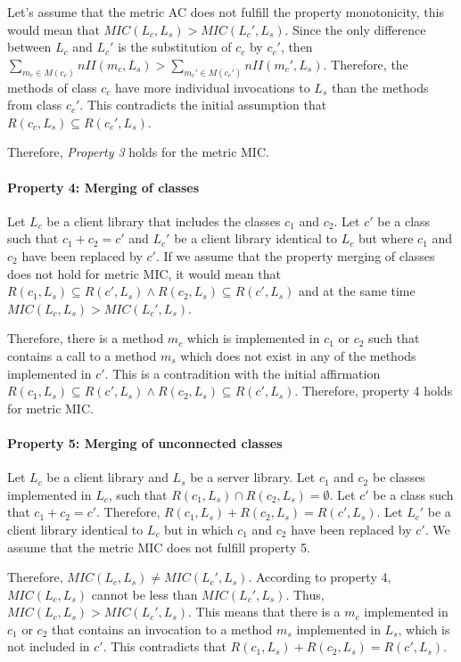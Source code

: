 Let's assume that the metric AC does not fulfill the property monotonicity, this would mean that $MIC(L_c, L_s) > MIC(L_c', L_s)$. Since the only difference between $L_c$ and $L_c'$ is the substitution of $c_c$ by $c_c'$, then $\sum_{m_c \in M(c_c)} nII(m_c, L_s) > \sum_{m_c' \in M(c_c')} nII(m_c', L_s)$. Therefore, the methods of class $c_c$ have more individual invocations to $L_s$ than the methods from class $c_c'$. This contradicts the initial assumption that $R(c_c, L_s) \subseteq R(c_c', L_s)$.

Therefore, \textit{Property 3} holds for the metric MIC.

\paragraph{Property 4: Merging of classes}
Let $L_c$ be a client library that includes the classes $c_1$ and $c_2$. Let $c'$ be a class such that $c_1 + c_2 = c'$ and $L_c'$ be a client library identical to $L_c$ but where $c_1$ and $c_2$ have been replaced by $c'$. If we assume that the property merging of classes does not hold for metric MIC, it would mean that $R(c_1, L_s) \subseteq R(c', L_s) \land R(c_2, L_s) \subseteq R(c', L_s)$ and at the same time $MIC(L_c, L_s) > MIC(L_c', L_s)$.

Therefore, there is a method $m_c$ which is implemented in $c_1$ or $c_2$ such that contains a call to a method $m_s$ which does not exist in any of the methods implemented in $c'$. This is a contradition with the initial affirmation $R(c_1, L_s) \subseteq R(c', L_s) \land R(c_2, L_s) \subseteq R(c', L_s)$. Therefore, property 4 holds for metric MIC.

\paragraph{Property 5: Merging of unconnected classes}
Let $L_c$ be a client library and $L_s$ be a server library. Let $c_1$ and $c_2$ be classes implemented in $L_c$, such that $R(c_1, L_s) \cap R(c_2, L_s) = \emptyset$. Let $c'$ be a class such that $c_1 + c_2 = c'$. Therefore, $R(c_1, L_s) + R(c_2, L_s) = R(c', L_s)$. Let $L_c'$ be a client library identical to $L_c$ but in which $c_1$ and $c_2$ have been replaced by $c'$. We assume that the metric MIC does not fulfill property 5.

Therefore, $MIC(L_c, L_s) \neq MIC(L_c', L_s)$. According to property 4, $MIC(L_c, L_s)$ cannot be less than $MIC(L_c', L_s)$. Thus, $MIC(L_c, L_s) > MIC(L_c', L_s)$. This means that there is a $m_c$ implemented in $c_1$ or $c_2$ that contains an invocation to a method $m_s$ implemented in $L_s$, which is not included in $c'$. This contradicts that $R(c_1, L_s) + R(c_2, L_s) = R(c', L_s)$.

